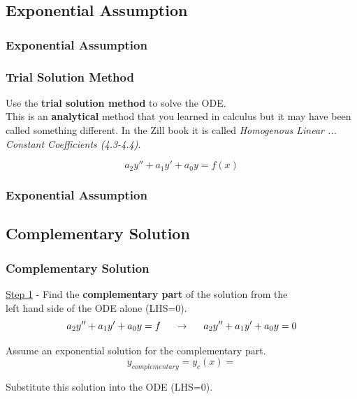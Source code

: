 \documentclass[fleqn]{beamer} %
\newcommand{\sectionIIIsubsectionItitle}{Exponential Assumption}
\newcommand{\sectionIIIsubsectionIItitle}{Complementary Solution}
\begin{document}
		\subsection{\sectionIIIsubsectionItitle}\label{sectionIIIsubsectionI}

			\begin{frame}
				\frametitle{\sectionIIIsubsectionItitle}
				\bigskip


\frametitle{Trial Solution Method}
Use the {\bf trial solution method} to solve the ODE. \vspace{2mm}\\
This is an {\bf analytical} method that you learned in calculus but it may have been called something different. In the Zill book it is called {\it Homogenous Linear ... Constant Coefficients (4.3-4.4)}. \vspcc

\[a_2y''+a_1y'+a_0y=f(x)\] 
				

				\btVFill
			\end{frame}

			\begin{frame}
				\frametitle{\sectionIIIsubsectionItitle}
				\bigskip
				

				\btVFill
			\end{frame}

		\subsection{\sectionIIIsubsectionIItitle}\label{sectionIIIsubsectionII}	

			\begin{frame}
				\frametitle{\sectionIIIsubsectionIItitle}
				\bigskip

				\underline{Step 1} - Find the {\bf complementary part} of the solution from the \vspace{1mm}\\ left hand side of the ODE alone (LHS=0). \\

				\[a_2y''+a_1y'+a_0y=f \hspace{5mm}\rightarrow\hspace{5mm} a_2y''+a_1y'+a_0y=0\] 

				Assume an exponential solution for the complementary part. \[y_{complementary}=y_c(x)=\] 

				Substitute this solution into the ODE (LHS=0).
				
				\btVFill
			\end{frame}
\end{document}

